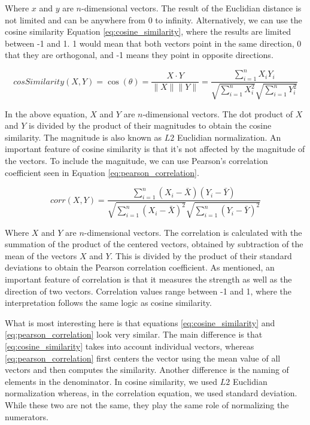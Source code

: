 Where $x$ and $y$ are $n$-dimensional vectors.
The result of the Euclidian distance is not limited and can be anywhere from 0 to infinity.
Alternatively, we can use the cosine similarity Equation \ref{eq:cosine_similarity}, where the results are limited between -1 and 1.
1 would mean that both vectors point in the same direction, 0 that they are orthogonal, and -1 means they point in opposite directions.

\begin{equation}
	\label{eq:cosine_similarity}
	cosSimilarity(X,Y) = \cos(\theta) =  \frac{X \cdot Y}{\|X\| \|Y\|} = \frac{\sum_{i=1}^{n} X_i Y_i}{\sqrt{\sum_{i=1}^{n} X_i^2} \sqrt{\sum_{i=1}^{n} Y_i^2}}
\end{equation}

In the above equation, $X$ and $Y$ are $n$-dimensional vectors.
The dot product of $X$ and $Y$ is divided by the product of their magnitudes to obtain the cosine similarity.
The magnitude is also known as $L2$ Euclidian normalization.
An important feature of cosine similarity is that it's not affected by the magnitude of the vectors.
To include the magnitude, we can use Pearson's correlation coefficient seen in Equation \ref{eq:pearson_correlation}.

\begin{equation}
	\label{eq:pearson_correlation}
	corr(X,Y) =  \frac{\sum_{i=1}^{n} (X_i - \bar{X})(Y_i - \bar{Y})}{\sqrt{\sum_{i=1}^{n} (X_i - \bar{X})^2} \sqrt{\sum_{i=1}^{n} (Y_i - \bar{Y})^2}}
\end{equation}

Where $X$ and $Y$ are $n$-dimensional vectors.
The correlation is calculated with the summation of the product of the centered vectors, obtained by subtraction of the mean of the vectors $X$ and $Y$. This is divided by the product of their standard deviations to obtain the Pearson correlation coefficient.
As mentioned, an important feature of correlation is that it measures the strength as well as the direction of two vectors.
Correlation values range between -1 and 1, where the interpretation follows the same logic as cosine similarity.

What is most interesting here is that equations \ref{eq:cosine_similarity} and \ref{eq:pearson_correlation} look very similar.
The main difference is that \ref{eq:cosine_similarity} takes into account individual vectors, whereas \ref{eq:pearson_correlation} first centers the vector using the mean value of all vectors and then computes the similarity.
Another difference is the naming of elements in the denominator.
In cosine similarity, we used $L2$ Euclidian normalization whereas, in the correlation equation, we used standard deviation.
While these two are not the same, they play the same role of normalizing the numerators.

